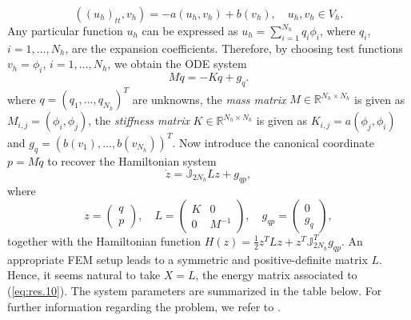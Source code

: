 \begin{equation} \label{eq:res.8}
	((u_h)_{tt},v_h) = - a(u_h,v_h) + b(v_h),\quad u_h,v_h\in V_h.
\end{equation}
Any particular function $u_h$ can be expressed as $u_h = \sum_{i=1}^{N_h} q_i \phi_i$, where $q_i$, $i=1,\dots,N_h$, are the expansion coefficients. Therefore, by choosing test functions $v_h = \phi_i$, $i=1,\dots,N_h$, we obtain the ODE system
\begin{equation} \label{eq:res.9}
	M\ddot q = -K q + g_{q}.
\end{equation}
where $q=(q_1,\dots,q_{N_h})^T$ are unknowns, the \emph{mass matrix} $M\in \mathbb R^{N_h\times N_h}$ is given as $M_{i,j} = (\phi_i,\phi_j)$, the \emph{stiffness matrix} $K\in \mathbb R^{N_h\times N_h}$ is given as $K_{i,j} = a(\phi_j,\phi_i)$ and $g_q=(b(v_1),\dots,b(v_{N_h}))^T$. Now introduce the canonical coordinate $p = M\dot q$ to recover the Hamiltonian system
\begin{equation} \label{eq:res.10}
	\dot z = \mathbb J_{2N_h} Lz + g_{qp},
\end{equation}
where
\begin{equation} \label{eq:res.11}
	z = 
	\begin{pmatrix}
	q \\
	p	
	\end{pmatrix}, \quad 
	L = 
	\begin{pmatrix}
	K & 0 \\
	0 & M^{-1}
	\end{pmatrix}, \quad
	g_{qp} =
	\begin{pmatrix}
	0 \\
	g_q
	\end{pmatrix},
\end{equation}
together with the Hamiltonian function $H(z) = \frac{1}{2} z^TLz + z^T \mathbb J_{2N_h}^T g_{qp}$. An appropriate FEM setup leads to a symmetric and positive-definite matrix $L$. Hence, it seems natural to take $X=L$, the energy matrix associated to (\ref{eq:res.10}). The system parameters are summarized in the table below. For further information regarding the problem, we refer to \cite{langtangen2017solving}.

